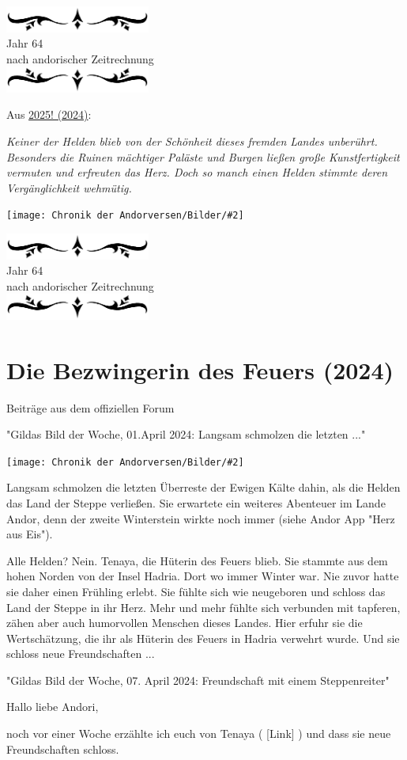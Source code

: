 \documentclass[10pt, a4paper, oneside]{book}
\newcommand{\fillbreak}{\vspace*{\fill}\columnbreak}
\newcommand{\storytext}[1]{%
    \section{#1}%
    \label{Storytext: #1}%
}
\newcommand{\refstorytext}[1]{\hyperref[Storytext: #1]{#1}}
\newcommand{\bildmitts}[2][height=0.32\textwidth,width=0.48\textwidth,keepaspectratio]{%
    \begin{center}
        \texttt{[image: Chronik der Andorversen/Bilder/\#2]}
    \end{center}
}
\newcommand{\az}[1]{%
    \begin{center}
        \includegraphics[width=180px]{Chronik der Andorversen/verzierung1.png}\\
        {\Huge #1} \\
        {nach andorischer Zeitrechnung}\\
        \includegraphics[width=180px]{Chronik der Andorversen/verzierung2.png}
    \end{center}
    \extramarks{}{#1 a.Z.}
}
\begin{document}
\begin{multicols}{2}
\begin{chapterbox}
    \az{Jahr 64}

    \begin{center}
        Aus \refstorytext{2025! (2024)}:
    \end{center}



    \textit{Keiner der Helden blieb von der Schönheit dieses fremden Landes unberührt. Besonders die Ruinen mächtiger Paläste und Burgen ließen große Kunstfertigkeit vermuten und erfreuten das Herz. Doch so manch einen Helden stimmte deren Vergänglichkeit wehmütig.}

    \bildmitts[width=\textwidth]{Andor Das Ferne Land Banner.jpeg}


\end{chapterbox}



\fillbreak
\az{Jahr 64}
\storytext{Die Bezwingerin des Feuers (2024)}

\begin{center}
    Beiträge aus dem offiziellen Forum

    "Gildas Bild der Woche, 01.April 2024: Langsam schmolzen die letzten ..."
\end{center}

\bildmitts{Die Bezwingerin des Feuers 1.jpeg}

Langsam schmolzen die letzten Überreste der Ewigen Kälte dahin, als die Helden das Land der Steppe verließen. Sie erwartete ein weiteres Abenteuer im Lande Andor, denn der zweite Winterstein wirkte noch immer (siehe Andor App "Herz aus Eis").

Alle Helden? Nein. Tenaya, die Hüterin des Feuers blieb. Sie stammte aus dem hohen Norden von der Insel Hadria. Dort wo immer Winter war. Nie zuvor hatte sie daher einen Frühling erlebt. Sie fühlte sich wie neugeboren und schloss das Land der Steppe in ihr Herz. Mehr und mehr fühlte sich verbunden mit tapferen, zähen aber auch humorvollen Menschen dieses Landes. Hier erfuhr sie die Wertschätzung, die ihr als Hüterin des Feuers in Hadria verwehrt wurde. Und sie schloss neue Freundschaften ...


\begin{center}
    "Gildas Bild der Woche, 07. April 2024: Freundschaft mit einem Steppenreiter"
\end{center}

Hallo liebe Andori,

noch vor einer Woche erzählte ich euch von Tenaya ( [Link] ) und dass sie neue Freundschaften schloss.


\end{multicols}
\end{document}
